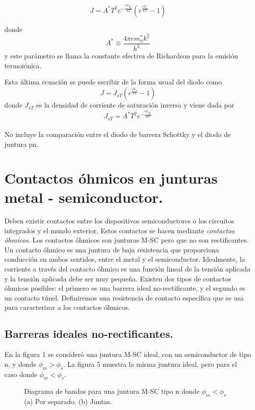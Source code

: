 \documentclass[12pt,a4paper]{article}
\begin{document}
\[ J=A^{\ast}T^{2}e^{-\frac{e\phi _{B_{0}}}{kT}} (e^{\frac{eV_{a}}{kT}} -1)\]

donde
\[ A^{\ast} \equiv \frac{4 \pi e m_{n}^{\ast} k^{2}}{h^{3}}\]
y este parámetro se llama la constante efectiva de Richardson para la emisión termoiónica.

Esta última ecuación se puede escribir de la forma usual del diodo como
\[ J= J_{sT} (e^{\frac{eV_{a}}{kT}}-1) \]
donde $J_{sT}$ es la densidad de corriente de saturación inversa y viene dada por
\[ J_{sT}=A^{\ast}T^{2}e^{-\frac{e \phi _{B_{0}}}{kT}} \]

\paragraph{}

\scriptsize No incluye la comparación entre el diodo de barrera Schottky y el diodo de juntura pn.

\normalsize

\section{Contactos óhmicos en junturas metal - semiconductor.}

Deben existir contactos entre los dispositivos semiconductores o los circuitos integrados y el mundo exterior. Estos contactos se hacen mediante \emph{contactos óhmicos}. Los contactos óhmicos son junturas M-SC pero que no son rectificantes. Un contacto óhmico es una juntura de baja resistencia que proporciona conducción en ambos sentidos, entre el metal y el semiconductor. Idealmente, la corriente a través del contacto óhmico es una función lineal de la tensión aplicada y la tensión aplicada debe ser muy pequeña. Existen dos tipos de contactos óhmicos posibles: el primero es una barrera ideal no-rectificante, y el segundo es un contacto túnel. Definiremos una resistencia de contacto específica que se usa para caracterizar a los contactos óhmicos.

\subsection{Barreras ideales no-rectificantes.}

En la figura 1 se consideró una juntura M-SC ideal, con un semiconductor de tipo n, y donde $\phi _{m} > \phi _{s}$. La figura 5 muestra la misma juntura ideal, pero para el caso donde $\phi _{m}< \phi _{s}$.

\begin{figure}[ht!]
\begin{center}
\caption{Diagrama de bandas para una juntura M-SC tipo n donde $\phi _{m}< \phi _{s}$ (a) Por separado. (b) Juntas.}
\end{center}
\end{figure}
\end{document}
